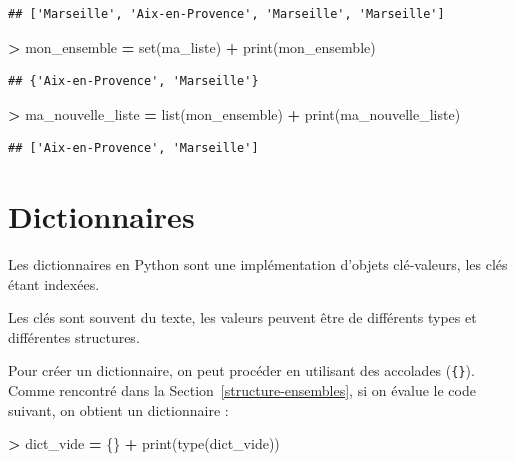 \documentclass[12pt,]{book}
\newenvironment{Shaded}{\begin{snugshade}}{\end{snugshade}}
\newcommand{\OperatorTok}[1]{\textcolor[rgb]{0.81,0.36,0.00}{\textbf{#1}}}
\newcommand{\BuiltInTok}[1]{#1}
\newcommand{\NormalTok}[1]{#1}
\numberwithin{equation}{section}
\numberwithin{countremarque}{section}
\begin{document}
\begin{lstlisting}
## ['Marseille', 'Aix-en-Provence', 'Marseille', 'Marseille']
\end{lstlisting}

\begin{Shaded}
\begin{Highlighting}[]
\OperatorTok{>}\NormalTok{ mon_ensemble }\OperatorTok{=} \BuiltInTok{set}\NormalTok{(ma_liste)}
\OperatorTok{+} \BuiltInTok{print}\NormalTok{(mon_ensemble)}
\end{Highlighting}
\end{Shaded}

\begin{lstlisting}
## {'Aix-en-Provence', 'Marseille'}
\end{lstlisting}

\begin{Shaded}
\begin{Highlighting}[]
\OperatorTok{>}\NormalTok{ ma_nouvelle_liste }\OperatorTok{=} \BuiltInTok{list}\NormalTok{(mon_ensemble)}
\OperatorTok{+} \BuiltInTok{print}\NormalTok{(ma_nouvelle_liste)}
\end{Highlighting}
\end{Shaded}

\begin{lstlisting}
## ['Aix-en-Provence', 'Marseille']
\end{lstlisting}

\section{Dictionnaires}\label{type-dict}

Les dictionnaires en Python sont une implémentation d'objets
clé-valeurs, les clés étant indexées.

Les clés sont souvent du texte, les valeurs peuvent être de différents
types et différentes structures.

Pour créer un dictionnaire, on peut procéder en utilisant des accolades
(\texttt{\{\}}). Comme rencontré dans la
Section~\ref{structure-ensembles}, si on évalue le code suivant, on
obtient un dictionnaire :

\begin{Shaded}
\begin{Highlighting}[]
\OperatorTok{>}\NormalTok{ dict_vide }\OperatorTok{=}\NormalTok{ \{\}}
\OperatorTok{+} \BuiltInTok{print}\NormalTok{(}\BuiltInTok{type}\NormalTok{(dict_vide))}
\end{Highlighting}
\end{Shaded}
\end{document}
